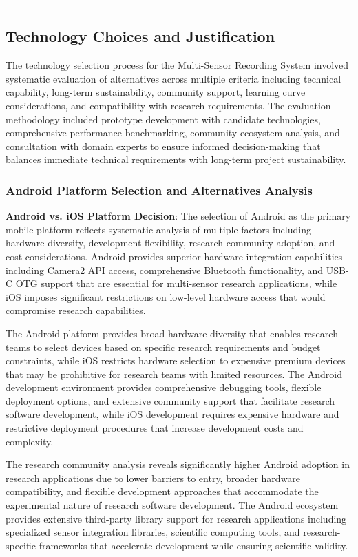 \documentclass[11pt,a4paper]{report}
\begin{document}
\hrule

\subsection{Technology Choices and Justification}

The technology selection process for the Multi-Sensor Recording System involved systematic evaluation of alternatives
across multiple criteria including technical capability, long-term sustainability, community support, learning curve
considerations, and compatibility with research requirements. The evaluation methodology included prototype development
with candidate technologies, comprehensive performance benchmarking, community ecosystem analysis, and consultation with
domain experts to ensure informed decision-making that balances immediate technical requirements with long-term project
sustainability.

\subsubsection{Android Platform Selection and Alternatives Analysis}

\textbf{Android vs. iOS Platform Decision}: The selection of Android as the primary mobile platform reflects systematic
analysis of multiple factors including hardware diversity, development flexibility, research community adoption, and
cost considerations. Android provides superior hardware integration capabilities including Camera2 API access,
comprehensive Bluetooth functionality, and USB-C OTG support that are essential for multi-sensor research applications,
while iOS imposes significant restrictions on low-level hardware access that would compromise research capabilities.

The Android platform provides broad hardware diversity that enables research teams to select devices based on specific
research requirements and budget constraints, while iOS restricts hardware selection to expensive premium devices that
may be prohibitive for research teams with limited resources. The Android development environment provides comprehensive
debugging tools, flexible deployment options, and extensive community support that facilitate research software
development, while iOS development requires expensive hardware and restrictive deployment procedures that increase
development costs and complexity.

The research community analysis reveals significantly higher Android adoption in research applications due to lower
barriers to entry, broader hardware compatibility, and flexible development approaches that accommodate the experimental
nature of research software development. The Android ecosystem provides extensive third-party library support for
research applications including specialized sensor integration libraries, scientific computing tools, and
research-specific frameworks that accelerate development while ensuring scientific validity.
\end{document}
